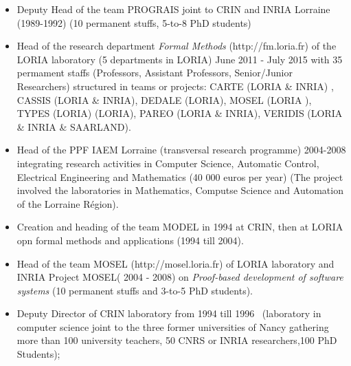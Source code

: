 \documentclass[ 12pt]{article}
\begin{document}

\begin{itemize}


\item Deputy Head of the team  PROGRAIS  joint to CRIN  and INRIA Lorraine (1989-1992) (10 permanent stuffs, 5-to-8 PhD students)

\item Head of the research department   \textit{Formal Methods}
  (http://fm.loria.fr) of the LORIA laboratory (5 departments in LORIA)     June 2011 - July 2015  with  35 permament staffs (Professors, Assistant Professors, Senior/Junior Researchers)  structured in  teams or projects: CARTE (LORIA \& INRIA) , CASSIS  (LORIA \& INRIA), DEDALE (LORIA), MOSEL (LORIA ), TYPES (LORIA)  (LORIA), PAREO  (LORIA \& INRIA), VERIDIS (LORIA \& INRIA \& SAARLAND). 

\item Head of the  PPF IAEM Lorraine (transversal research programme)  2004-2008 integrating  research activities in Computer Science, Automatic Control, Electrical Engineering  and Mathematics  (40 000 euros per year) (The project involved the laboratories in Mathematics, Computse Science and Automation of the Lorraine R\'egion). 

\item Creation and heading of the team  MODEL  in  1994 at  CRIN, then at  LORIA opn formal methods and applications (1994 till 2004).

\item Head of the team  MOSEL (http://mosel.loria.fr) of LORIA laboratory  and INRIA Project   MOSEL( 2004 -  2008) on  \textit{Proof-based development of software systems} (10 permanent stuffs and 3-to-5 PhD students).

\item Deputy Director of CRIN laboratory from  1994 till  1996~ (laboratory in computer science  joint to the three former universities of Nancy gathering more than 100 university teachers, 50 CNRS or INRIA researchers,100 PhD Students);



\end{itemize}


\end{document}
